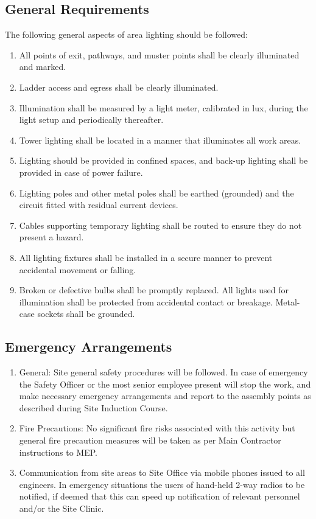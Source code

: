 \subsection{General Requirements}

The following general aspects of area lighting should be followed:
\begin{enumerate}
\item	All points of exit, pathways, and muster points shall be clearly illuminated and marked. 
\item	Ladder access and egress shall be clearly illuminated.
\item Illumination shall be measured by a light meter, calibrated in lux, during the light setup and periodically thereafter.
\item	Tower lighting shall be located in a manner that illuminates all work areas.
\item	Lighting should be provided in confined spaces, and back-up lighting shall be provided in case of power failure.
\item Lighting poles and other metal poles shall be earthed (grounded) and the circuit fitted with residual current devices.
\item Cables supporting temporary lighting shall be routed to ensure they do not present a hazard.
\item All lighting fixtures shall be installed in a secure manner to prevent accidental movement or falling.
\item Broken or defective bulbs shall be promptly replaced.  All lights used for illumination shall be protected from accidental contact or breakage.  Metal-case sockets shall be grounded.
\end{enumerate}


\subsection{Emergency Arrangements}
\begin{enumerate}
\item	General: Site general safety procedures will be followed.  In case of emergency the Safety Officer or the most senior employee present will stop the work, and make necessary emergency arrangements and report to the assembly points as described during Site Induction Course.
	
\item    Fire Precautions: No significant fire risks associated with this activity but general 
fire precaution measures will be taken as per Main Contractor instructions to MEP.

\item	Communication from site areas to Site Office via mobile phones issued to all engineers.  In emergency situations the users of hand-held 2-way radios to be notified, if deemed that this can speed up notification of relevant personnel and/or the Site Clinic.

\end{enumerate}









